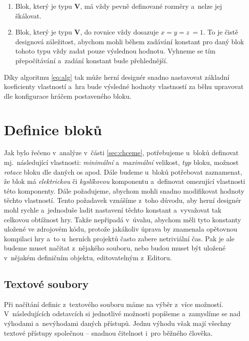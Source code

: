 \begin{enumerate}
	\item Blok, který je typu \textbf{V}, má vždy pevně definované rozměry a~nelze jej škálovat.
	\item Blok, který je typu \textbf{V}, do rovnice vždy dosazuje $ x = y = z~= 1$.
	\subitem To je čistě designová záležitost, abychom mohli během zadávání konstant pro daný blok tohoto typu vždy zadat pouze výslednou hodnotu. Vyhneme se tím přepočítávání a~zadání konstant bude přehlednější.
\end{enumerate}

Díky algoritmu \ref{eq:alg} tak může herní designér snadno nastavovat základní koeficienty vlastností a~hra bude výsledné hodnoty vlastností za běhu upravovat dle konfigurace hráčem postaveného bloku.




\section{Definice bloků}

Jak bylo řečeno v~analýze v~části \ref{sec:chceme}, potřebujeme u~bloků definovat mj.~následující vlastnosti: \textit{minimální} a~\textit{maximální} velikost, \textit{typ} bloku, možnost \textit{rotace} bloku dle daných os apod. Dále budeme u~bloků potřebovat zaznamenat, že blok má \textit{elektrickou} či \textit{kyslíkovou} komponentu a~definovat omezující vlastnosti této komponenty. Dále požadujeme, abychom mohli snadno modifikovat hodnoty těchto vlastností. Tento požadavek vznášíme z~toho důvodu, aby herní designér mohl rychle a~jednoduše ladit nastavení těchto konstant a~vyvažovat tak celkovou obtížnost hry. Takže nepřipadá v~úvahu, abychom měli tyto konstanty uložené ve zdrojovém kódu, protože jakákoliv úprava by znamenala opětovnou kompilaci hry a~to u~herních projektů často zabere netriviální čas. Pak je ale budeme muset načítat z~nějakého souboru, nebo budou muset být uložené v~nějakém definičním objektu, editovatelným z~Editoru.


\subsection{Textové soubory}
Při načítání definic z~textového souboru máme na výběr z~více možností. V~následujících odstavcích si jednotlivé možnosti popíšeme a~zamyslíme se nad výhodami a~nevýhodami daných přístupů. Jednu výhodu však mají všechny textové přístupy společnou -- snadnou čitelnost i~pro běžného člověka.

